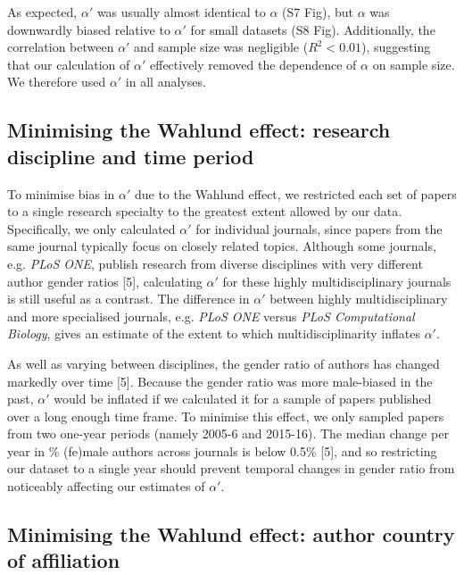 \documentclass[12pt,]{article}
\begin{document}
As expected, \(\alpha'\) was usually almost identical to \(\alpha\) (S7
Fig), but \(\alpha\) was downwardly biased relative to \(\alpha'\) for
small datasets (S8 Fig). Additionally, the correlation between
\(\alpha'\) and sample size was negligible (\(R^2 < 0.01\)), suggesting
that our calculation of \(\alpha'\) effectively removed the dependence
of \(\alpha\) on sample size. We therefore used \(\alpha'\) in all
analyses.

\subsection{Minimising the Wahlund effect: research discipline and time
period}\label{minimising-the-wahlund-effect-research-discipline-and-time-period}

To minimise bias in \(\alpha'\) due to the Wahlund effect, we restricted
each set of papers to a single research specialty to the greatest extent
allowed by our data. Specifically, we only calculated \(\alpha'\) for
individual journals, since papers from the same journal typically focus
on closely related topics. Although some journals, e.g. \emph{PLoS ONE},
publish research from diverse disciplines with very different author
gender ratios {[}5{]}, calculating \(\alpha'\) for these highly
multidisciplinary journals is still useful as a contrast. The difference
in \(\alpha'\) between highly multidisciplinary and more specialised
journals, e.g. \emph{PLoS ONE} versus \emph{PLoS Computational Biology},
gives an estimate of the extent to which multidisciplinarity inflates
\(\alpha'\).

As well as varying between disciplines, the gender ratio of authors has
changed markedly over time {[}5{]}. Because the gender ratio was more
male-biased in the past, \(\alpha'\) would be inflated if we calculated
it for a sample of papers published over a long enough time frame. To
minimise this effect, we only sampled papers from two one-year periods
(namely 2005-6 and 2015-16). The median change per year in \% (fe)male
authors across journals is below 0.5\% {[}5{]}, and so restricting our
dataset to a single year should prevent temporal changes in gender ratio
from noticeably affecting our estimates of \(\alpha'\).

\subsection{Minimising the Wahlund effect: author country of
affiliation}\label{minimising-the-wahlund-effect-author-country-of-affiliation}
\end{document}
